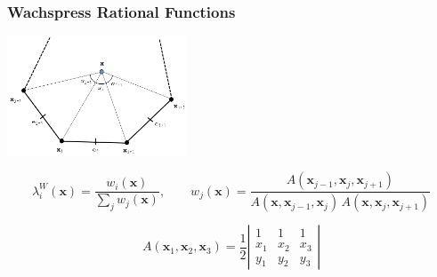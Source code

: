 \documentclass[compress,10pt]{beamer}
\renewcommand{\vec}[1]{\mathbf{#1}}
\begin{document}
\begin{frame}[t]\frametitle{Wachspress Rational Functions}
\centering
\includegraphics[width=0.40\textwidth]{images/ref_polygon.png}
\vspace{0.3cm}
\begin{block}{}
\begin{equation*}
\lambda_i^W (\vec{x}) = \frac{w_i (\vec{x}) }{ \sum_{j} w_j (\vec{x})}, \qquad w_j (\vec{x}) = \frac{A(\vec{x}_{j-1}, \vec{x}_{j}, \vec{x}_{j+1})}{A(\vec{x}, \vec{x}_{j-1}, \vec{x}_{j}) \, A(\vec{x}, \vec{x}_{j}, \vec{x}_{j+1})}
\end{equation*}
\end{block}
\begin{block}{}
\begin{equation*}
A(\vec{x}_1, \vec{x}_{2}, \vec{x}_{3}) = \frac{1}{2} \left|
\begin{array}{ccc}
1 & 1 & 1 \\
x_1 & x_2 & x_3 \\
y_1 & y_2 & y_3
\end{array} \right|
\end{equation*}
\end{block}
\end{frame}
\end{document}
